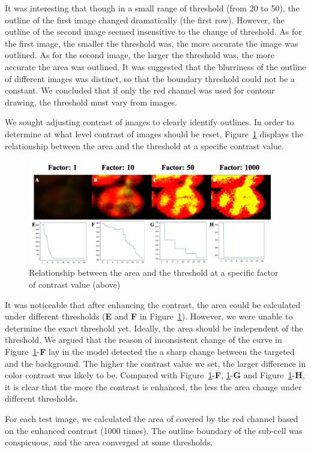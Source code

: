 \documentclass[12pt]{article}
\begin{document}
\par It was interesting that though in a small range of threshold (from 20 to 50), the outline of the first image changed dramatically (the first row). However, the outline of the second image seemed insensitive to the change of threshold. As for the first image, the smaller the threshold was, the more accurate the image was outlined.  As for the second image, the larger the threshold was, the more accurate the area was outlined. It was suggested that the blurriness of the outline of different images was distinct, so that the boundary threshold could not be a constant. We concluded that if only the red channel was used for contour drawing, the threshold must vary from images.
\par We sought adjusting contrast of images to clearly identify outlines. In order to determine at what level contrast of images should be reset, Figure~\ref{fig:contrast} displays the relationship between the area and the threshold at a specific contrast value.
\begin{figure}[!htbp]
    \centering
    \includegraphics[width=0.95\textwidth]{5.png}
    \caption{Relationship between the area and the threshold at a specific factor of contrast value (above)}
    \label{fig:contrast}
\end{figure}
\par It was noticeable that after enhancing the contrast, the area could be calculated under different thresholds (\textbf{E} and \textbf{F} in Figure~\ref{fig:contrast}). However, we were unable to determine the exact threshold yet. Ideally, the area should be independent of the threshold. We argued that the reason of inconsistent change of the curve in Figure~\ref{fig:contrast}-\textbf{F} lay in the model detected the a sharp change between the targeted and the background. The higher the contrast value we set, the larger difference in color contrast was likely to be. Compared with Figure~\ref{fig:contrast}-\textbf{F}, \ref{fig:contrast}-\textbf{G} and Figure~\ref{fig:contrast}-\textbf{H}, it is clear that the more the contrast is enhanced, the less the area change under different thresholds. 
\par For each test image, we calculated the area of covered by the red channel based on the enhanced contrast (1000 times). The outline boundary of the sub-cell was conspicuous, and the area converged at some thresholds.
\end{document}
